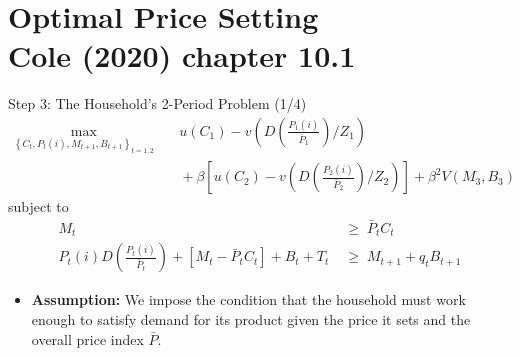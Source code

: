 \documentclass[10pt,c,aspectratio=1610,handout]{beamer}
\begin{document}
\section{Optimal Price Setting\\{\small Cole (2020) chapter 10.1}}%
\begin{frame}{Step 3: The Household's 2-Period Problem (1/4)}%
  \begin{align*}%
    \max_{\left\{ C_{t},P_{t}(i),M_{t+1},B_{t+1}\right\}_{t=1,2}} & \quad u(C_{1})-v\left( D\left( \frac{P_{1}(i)}{\bar{P}_{1}}\right) / Z_{1}\right)\\%
    & \quad +\beta \left[ u(C_{2})-v\left( D\left( \frac{P_{2}(i)}{\bar{P}_{2}}\right) /Z_{2}\right) \right] +\beta ^{2}V(M_{3},B_{3})%
  \end{align*}%
  subject to%
  \begin{align*}%
    M_{t} \; & \geq \; \bar{P}_{t} C_{t}\\%
    P_{t}(i) D\left( \frac{P_{t}(i)}{\bar{P}_{t}} \right) + \left[ M_{t}-\bar{P}_{t}C_{t}\right] + B_{t}+T_{t} \; & \geq \; M_{t+1} + q_{t}B_{t+1}%
  \end{align*}%
  \pause%
  \begin{itemize}%
    \item[$\rightarrow$] \textbf{Assumption:} We impose the condition that the household must work enough to satisfy demand for its product given the price it sets and the overall price index $\bar{P}$.%
  \end{itemize}%
\end{frame}%
\end{document}
